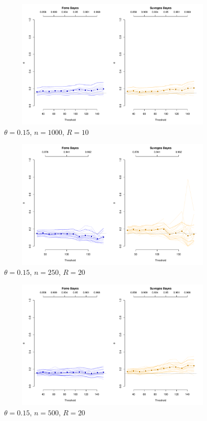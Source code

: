 \documentclass[12pt]{article}
\begin{document}
\begin{figure}
\begin{center}
\includegraphics[width=5.5in, height=2.45in]{../extremal_comparison/figs/sim_frechet_hier_15_1000_10.pdf}
\caption{$\theta=0.15$, $n=1000$, $R=10$}
\end{center}
\end{figure}

\newpage

\begin{figure}
\begin{center}
\includegraphics[width=5.5in, height=2.45in]{../extremal_comparison/figs/sim_frechet_hier_15_250_20.pdf}
\caption{$\theta=0.15$, $n=250$, $R=20$}
\end{center}
\end{figure}

\begin{figure}
\begin{center}
\includegraphics[width=5.5in, height=2.45in]{../extremal_comparison/figs/sim_frechet_hier_15_500_20.pdf}
\caption{$\theta=0.15$, $n=500$, $R=20$}
\end{center}
\end{figure}
\end{document}
